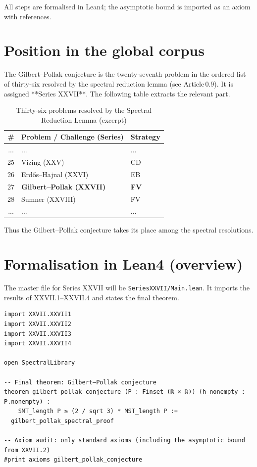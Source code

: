 \documentclass[11pt,a4paper]{article}
\begin{document}
All steps are formalised in Lean4; the asymptotic bound is imported as an axiom with references.

\section{Position in the global corpus}

The Gilbert–Pollak conjecture is the twenty‑seventh problem in the ordered list of thirty‑six resolved by the spectral reduction lemma (see Article 0.9). It is assigned **Series XXVII**. The following table extracts the relevant part.

\begin{center}
\begin{longtable}{@{}cll@{}}
\caption{Thirty‑six problems resolved by the Spectral Reduction Lemma (excerpt)}\\
\toprule
\# & Problem / Challenge (Series) & Strategy \\
\midrule
... & ... & ... \\
25 & Vizing (XXV) & CD \\
26 & Erdős–Hajnal (XXVI) & EB \\
27 & \textbf{Gilbert–Pollak (XXVII)} & \textbf{FV} \\
28 & Sumner (XXVIII) & FV \\
... & ... & ... \\
\bottomrule
\end{longtable}
\end{center}

Thus the Gilbert–Pollak conjecture takes its place among the spectral resolutions.

\section{Formalisation in Lean4 (overview)}

The master file for Series XXVII will be \texttt{SeriesXXVII/Main.lean}. It imports the results of XXVII.1–XXVII.4 and states the final theorem.

\begin{lstlisting}[style=lean, caption={MainXXVII.lean (sketch)}]
import XXVII.XXVII1
import XXVII.XXVII2
import XXVII.XXVII3
import XXVII.XXVII4

open SpectralLibrary

-- Final theorem: Gilbert–Pollak conjecture
theorem gilbert_pollak_conjecture (P : Finset (ℝ × ℝ)) (h_nonempty : P.nonempty) :
    SMT_length P ≥ (2 / sqrt 3) * MST_length P :=
  gilbert_pollak_spectral_proof

-- Axiom audit: only standard axioms (including the asymptotic bound from XXVII.2)
#print axioms gilbert_pollak_conjecture
\end{lstlisting}
\end{document}
